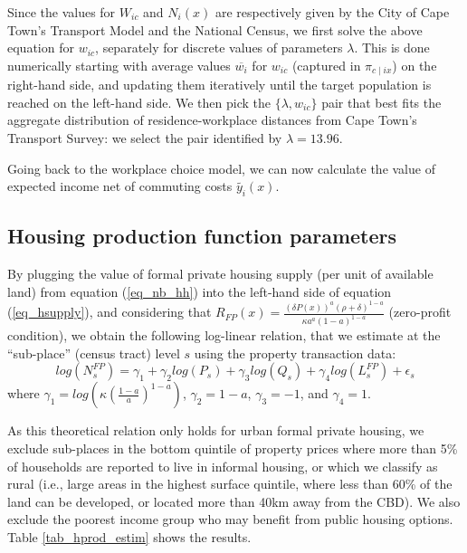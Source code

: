 \documentclass[12pt]{article}
\begin{document}
Since the values for $W_{ic}$ and $N_i(x)$ are respectively given by the City of Cape Town's Transport Model and the National Census, we first solve the above equation for $w_{ic}$, separately for discrete values of parameters $\lambda$. This is done numerically starting with average values $\overline{w_i}$ for $w_{ic}$ (captured in $\pi_{c \mid ix}$) on the right-hand side, and updating them iteratively until the target population is reached on the left-hand side. We then pick the $\{\lambda,w_{ic}\}$ pair that best fits the aggregate distribution of residence-workplace distances from Cape Town's Transport Survey: we select the pair identified by $\lambda = 13.96$.

Going back to the workplace choice model, we can now calculate the value of expected income net of commuting costs $\tilde{y_i}(x)$.

%

\subsection{Housing production function parameters \label{sec:estim_hprod}}

By plugging the value of formal private housing supply (per unit of available land) from equation (\ref{eq_nb_hh}) into the left-hand side of equation (\ref{eq_hsupply}), and considering that $R_{FP}(x)=\frac{(\delta P(x))^a(\rho+\delta)^{1-a}}{\kappa a^a(1-a)^{1-a}}$ (zero-profit condition), we obtain the following log-linear relation, that we estimate at the ``sub-place'' (census tract) level $s$ using the property transaction data:
\begin{equation*}
    log(N_s^{FP}) = \gamma_1 + \gamma_2 log(P_s) + \gamma_3 log(Q_s) + \gamma_4 log(L_s^{FP}) + \epsilon_s
\end{equation*}
where $\gamma_1 = log \left(\kappa (\frac{1-a}{a})^{1-a} \right)$, $\gamma_2 = 1-a$, $\gamma_3 = -1$, and $\gamma_4 = 1$.

As this theoretical relation only holds for urban formal private housing, we exclude sub-places in the bottom quintile of property prices where more than 5\% of households are reported to live in informal housing, or which we classify as rural (i.e., large areas in the highest surface quintile, where less than 60\% of the land can be developed, or located more than 40km away from the CBD). We also exclude the poorest income group who may benefit from public housing options. Table \ref{tab_hprod_estim} shows the results.
\end{document}

